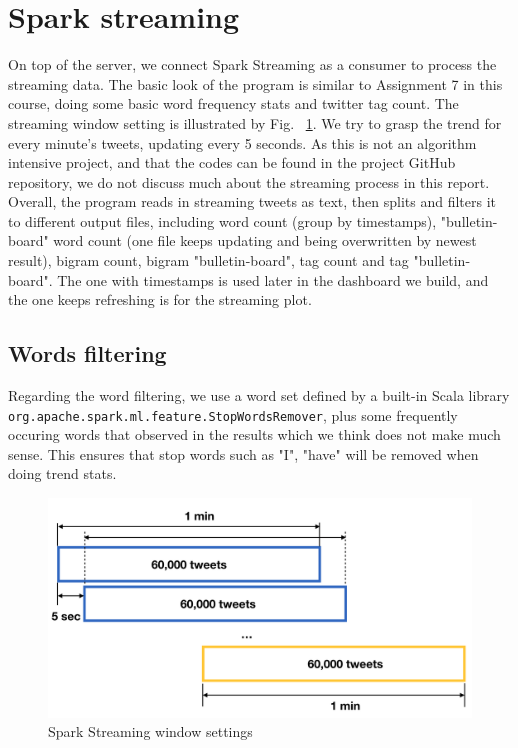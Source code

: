 \documentclass[manuscript, review, screen]{acmart}
\begin{document}
\section{Spark streaming}
On top of the server, we connect Spark Streaming as a consumer to process the streaming data. The basic look of the program is similar to Assignment 7 in this course, doing some basic word frequency stats and twitter tag count. The streaming window setting is illustrated by Fig. ~\ref{fig:sparkstreaming}. We try to grasp the trend for every minute's tweets, updating every 5 seconds. As this is not an algorithm intensive project, and that the codes can be found in the project GitHub repository, we do not discuss much about the streaming process in this report. Overall, the program reads in streaming tweets as text, then splits and filters it to different output files, including word count (group by timestamps), "bulletin-board" word count (one file keeps updating and being overwritten by newest result), bigram count, bigram "bulletin-board", tag count and tag "bulletin-board". The one with timestamps is used later in the dashboard we build, and the one keeps refreshing is for the streaming plot.\

\subsection{Words filtering}

Regarding the word filtering, we use a word set defined by a built-in Scala library\\ \texttt{org.apache.spark.ml.feature.StopWordsRemover}, plus some frequently occuring words that observed in the results which we think does not make much sense. This ensures that stop words such as "I", "have" will be removed when doing trend stats. 

\begin{figure}
    \centering
    \includegraphics[width=5in]{sparkstreaming.png}
    \caption{Spark Streaming window settings}
    \label{fig:sparkstreaming}
\end{figure}
\end{document}
